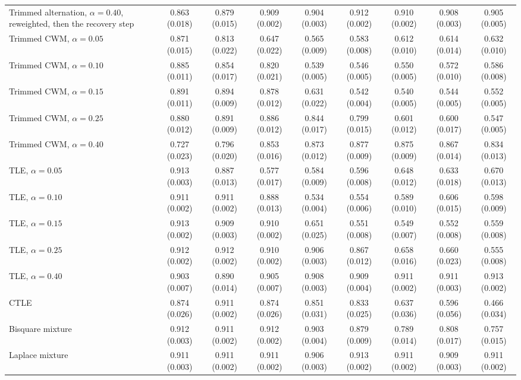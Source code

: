 \begin{table}[htbp]
{\begin{tabular}{lcccccccc}
Trimmed alternation, $\alpha=0.40$, reweighted, then the recovery step & 0.863 (0.018) & 0.879 (0.015) & 0.909 (0.002) & 0.904 (0.003) & 0.912 (0.002) & 0.910 (0.002) & 0.908 (0.003) & 0.905 (0.005) \\
Trimmed CWM, $\alpha=0.05$ & 0.871 (0.015) & 0.813 (0.022) & 0.647 (0.022) & 0.565 (0.009) & 0.583 (0.008) & 0.612 (0.010) & 0.614 (0.014) & 0.632 (0.010) \\
Trimmed CWM, $\alpha=0.10$ & 0.885 (0.011) & 0.854 (0.017) & 0.820 (0.021) & 0.539 (0.005) & 0.546 (0.005) & 0.550 (0.005) & 0.572 (0.010) & 0.586 (0.008) \\
Trimmed CWM, $\alpha=0.15$ & 0.891 (0.011) & 0.894 (0.009) & 0.878 (0.012) & 0.631 (0.022) & 0.542 (0.004) & 0.540 (0.005) & 0.544 (0.005) & 0.552 (0.005) \\
Trimmed CWM, $\alpha=0.25$ & 0.880 (0.012) & 0.891 (0.009) & 0.886 (0.012) & 0.844 (0.017) & 0.799 (0.015) & 0.601 (0.012) & 0.600 (0.017) & 0.547 (0.005) \\
Trimmed CWM, $\alpha=0.40$ & 0.727 (0.023) & 0.796 (0.020) & 0.853 (0.016) & 0.873 (0.012) & 0.877 (0.009) & 0.875 (0.009) & 0.867 (0.014) & 0.834 (0.013) \\
TLE, $\alpha=0.05$ & 0.913 (0.003) & 0.887 (0.013) & 0.577 (0.017) & 0.584 (0.009) & 0.596 (0.008) & 0.648 (0.012) & 0.633 (0.018) & 0.670 (0.013) \\
TLE, $\alpha=0.10$ & 0.911 (0.002) & 0.911 (0.002) & 0.888 (0.013) & 0.534 (0.004) & 0.554 (0.006) & 0.589 (0.010) & 0.606 (0.015) & 0.598 (0.009) \\
TLE, $\alpha=0.15$ & 0.913 (0.002) & 0.909 (0.003) & 0.910 (0.002) & 0.651 (0.025) & 0.551 (0.008) & 0.549 (0.007) & 0.552 (0.008) & 0.559 (0.008) \\
TLE, $\alpha=0.25$ & 0.912 (0.002) & 0.912 (0.002) & 0.910 (0.002) & 0.906 (0.003) & 0.867 (0.012) & 0.658 (0.016) & 0.660 (0.023) & 0.555 (0.008) \\
TLE, $\alpha=0.40$ & 0.903 (0.007) & 0.890 (0.014) & 0.905 (0.007) & 0.908 (0.003) & 0.909 (0.004) & 0.911 (0.002) & 0.911 (0.003) & 0.913 (0.002) \\
CTLE & 0.874 (0.026) & 0.911 (0.002) & 0.874 (0.026) & 0.851 (0.031) & 0.833 (0.025) & 0.637 (0.036) & 0.596 (0.056) & 0.466 (0.034) \\
Bisquare mixture & 0.912 (0.003) & 0.911 (0.002) & 0.912 (0.002) & 0.903 (0.004) & 0.879 (0.009) & 0.789 (0.014) & 0.808 (0.017) & 0.757 (0.015) \\
Laplace mixture & 0.911 (0.003) & 0.911 (0.002) & 0.911 (0.002) & 0.906 (0.003) & 0.913 (0.002) & 0.911 (0.002) & 0.909 (0.003) & 0.911 (0.002) \\

\end{tabular}}
\end{table}
